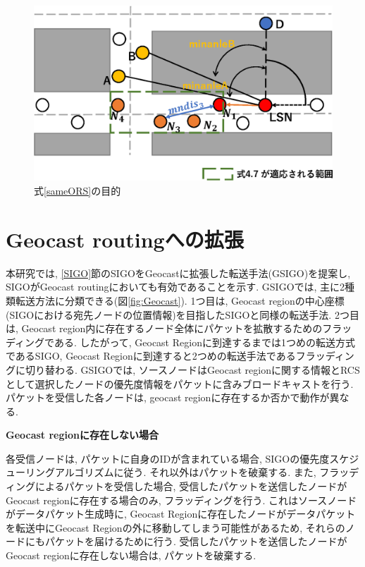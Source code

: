 \documentclass[10pt]{jreport}
\begin{document}
\begin{figure}[!ht]
	\centering
	\includegraphics[width=130mm]{figures/aim_minangle.eps}
	\caption{式\ref{sameORS}の目的}
	\label{fig:aim_minangle}
\end{figure}


\section{Geocast routingへの拡張}
本研究では, \ref{SIGO}節のSIGOをGeocastに拡張した転送手法(GSIGO)を提案し, SIGOがGeocast routingにおいても有効であることを示す. GSIGOでは, 主に2種類転送方法に分類できる(図\ref{fig:Geocast}). 1つ目は, Geocast regionの中心座標(SIGOにおける宛先ノードの位置情報)を目指したSIGOと同様の転送手法. 2つ目は, Geocast region内に存在するノード全体にパケットを拡散するためのフラッディングである. したがって, Geocast Regionに到達するまでは1つめの転送方式であるSIGO, Geocast Regionに到達すると2つめの転送手法であるフラッディングに切り替わる. 
GSIGOでは, ソースノードはGeocast regionに関する情報とRCSとして選択したノードの優先度情報をパケットに含みブロードキャストを行う.
パケットを受信した各ノードは, geocast regionに存在するか否かで動作が異なる.

\par
\vspace{5mm}
\noindent
\textbf{Geocast regionに存在しない場合}
\vspace{5mm}

各受信ノードは, パケットに自身のIDが含まれている場合, SIGOの優先度スケジューリングアルゴリズムに従う. それ以外はパケットを破棄する. また, フラッディングによるパケットを受信した場合, 受信したパケットを送信したノードがGeocast regionに存在する場合のみ, フラッディングを行う. これはソースノードがデータパケット生成時に, Geocast Regionに存在したノードがデータパケットを転送中にGeocast Regionの外に移動してしまう可能性があるため, それらのノードにもパケットを届けるために行う. 受信したパケットを送信したノードがGeocast regionに存在しない場合は, パケットを破棄する.
\end{document}
